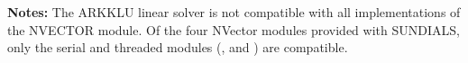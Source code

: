 \documentclass[letterpaper,10pt,english]{sphinxmanual}
\begin{document}
\begin{fulllineitems}
\begin{description}
\begin{itemize}
\end{itemize}

\end{description}

\textbf{Notes:}  The ARKKLU linear solver is not compatible with
all implementations of the NVECTOR module.  Of the four NVector
modules provided with SUNDIALS, only the serial and threaded
modules ({\hyperref[nvectors/NVector_Serial:nvectors-nvserial]{\emph{}}}, {\hyperref[nvectors/NVector_OpenMP:nvectors-openmp]{\emph{}}} and
{\hyperref[nvectors/NVector_Pthreads:nvectors-pthreads]{\emph{}}}) are compatible.

\end{fulllineitems}

\end{document}
